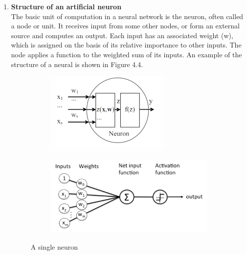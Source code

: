\begin{enumerate}
	\item \textbf{Structure of an artificial neuron}\\
	The basic unit of computation in a neural network is the neuron, often called a node or unit. It receives input from some other nodes, or form an external source and computes an output. Each input has an associated weight (w), which is assigned on the basis of its relative importance to other inputs. The node applies a function to the weighted sum of its inputs. An example of the structure of a neural is shown in Figure 4.4.
	\begin{figure}[h]
		\begin{subfigure}{0.5\textwidth}
			\includegraphics[width=0.9\linewidth, height=4cm]{Figures/Section3_OneNeuron_1.png} 
		\end{subfigure}
		\begin{subfigure}{0.5\textwidth}
			\includegraphics[width=0.9\linewidth, height=4cm]{Figures/Section3_OneNeuron_2.png}
		\end{subfigure}
		\captionsetup{justification=centering}
		\caption{A single neuron}
		\label{fig:single neuron}
	\end{figure}
	

\end{enumerate}
